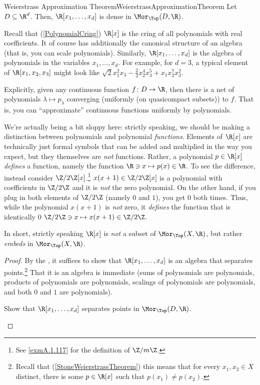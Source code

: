 \begin{crl}{Weierstrass Approximation Theorem}{WeierstrassApproximationTheorem}
Let $D\subseteq \R ^d$.  Then, $\R [x_1,\ldots ,x_d]$ is dense in $\Mor _{\Top}(D,\R )$.
\begin{rmk}
Recall that (\cref{PolynomialCring}) $\R [x]$ is the cring of all polynomials with real coefficients.  It of course has additionally the canonical structure of an algebra (that is, you can scale polynomials).  Similarly, $\R [x_1,\ldots ,x_d]$ is the algebra of polynomials in the variables $x_1,\ldots ,x_d$.  For example, for $d=3$, a typical element of $\R [x_1,x_2,x_3]$ might look like $\sqrt{2}x_1^2x_3-\frac{2}{3}x_2^4x_3^5+x_1x_2^7x_3^2$.
\end{rmk}
\begin{rmk}
Explicitly, given any continuous function $f\colon D\rightarrow \R$, then there is a net of polynomials $\lambda \mapsto p_{\lambda}$ converging (uniformly (on quasicompact subsets)) to $f$.  That is, you can ``approximate'' continuous functions uniformly by polynomials.
\end{rmk}
\begin{rmk}
We're actually being a bit sloppy here:  strictly speaking, we should be making a distinction between polynomials and polynomial \emph{functions}.  Elements of $\R [x]$ are technically just formal symbols that can be added and multiplied in the way you expect, but they themselves are \emph{not} functions.  Rather, a polynomial $p\in \R [x]$ \emph{defines} a function, namely the function $\R \ni x\mapsto p(x)\in \R$.  To see the difference, instead consider $\Z /2\Z [x]$.\footnote{See \cref{exmA.1.117} for the definition of $\Z /m\Z$.}  $x(x+1)\in \Z /2\Z [x]$ is a polynomial with coefficients in $\Z /2\Z$ and it is \emph{not} the zero polynomial.  On the other hand, if you plug in both elements of $\Z /2\Z$ (namely $0$ and $1$), you get $0$ both times.  Thus, while the polynomial $x(x+1)$ is \emph{not} zero, it \emph{defines} the function that is identically $0$ $\Z /2\Z \ni x\mapsto x(x+1)\in \Z /2\Z$.

In short, strictly speaking $\R [x]$ is \emph{not} a subset of $\Mor _{\Top}(X,\R )$, but rather \emph{embeds} in $\Mor _{\Top}(X,\R )$.
\end{rmk}
\begin{proof}
By the , it suffices to show that $\R [x_1,\ldots ,x_d]$ is an algebra that separates points.\footnote{Recall that (\cref{StoneWeierstrassTheorem}) this means that for every $x_1,x_2\in X$ distinct, there is some $p\in \R [x]$ such that $p(x_1)\neq p(x_2)$.}  That it is an algebra is immediate (sums of polynomials are polynomials, products of polynomials are polynomials, scalings of polynomials are polynomials, and both $0$ and $1$ are polynomials).
\begin{exr}[breakable=false]{}{}
Show that $\R [x_1,\ldots ,x_d]$ separates points in $\Mor _{\Top}(D,\R )$.
\end{exr}
\end{proof}
\end{crl}

